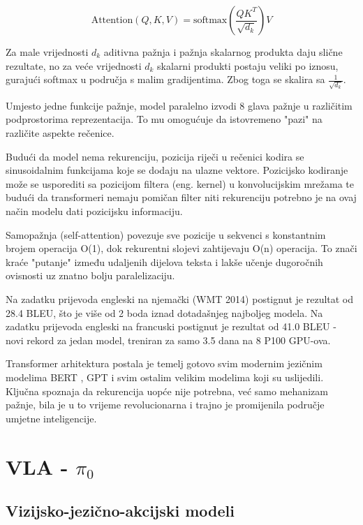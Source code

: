 \documentclass[times, utf8, diplomski]{fer}
\begin{document}
\begin{equation}
    \text{Attention}(Q, K, V) = \text{softmax}\left(\frac{QK^T}{\sqrt{d_k}}\right)V
\end{equation}

Za male vrijednosti $d_k$ aditivna pažnja \cite{bahdanau2014neural} i pažnja skalarnog produkta daju slične rezultate, no za veće vrijednosti $d_k$ skalarni produkti postaju veliki po iznosu, gurajući softmax u područja s malim gradijentima. Zbog toga se skalira sa $\frac{1}{\sqrt{d_k}}$.

Umjesto jedne funkcije pažnje, model paralelno izvodi 8 glava pažnje u različitim podprostorima reprezentacija. To mu omogućuje da istovremeno "pazi" na različite aspekte rečenice.

Budući da model nema rekurenciju, pozicija riječi u rečenici kodira se sinusoidalnim funkcijama koje se dodaju na ulazne vektore. Pozicijsko kodiranje može se usporediti sa pozicijom filtera (eng. kernel) u konvolucijskim mrežama te budući da transformeri nemaju pomičan filter niti rekurenciju potrebno je na ovaj način modelu dati pozicijsku informaciju.

Samopažnja (self-attention) povezuje sve pozicije u sekvenci s konstantnim brojem operacija O(1), dok rekurentni slojevi zahtijevaju O(n) operacija. To znači kraće "putanje" između udaljenih dijelova teksta i lakše učenje dugoročnih ovisnosti uz znatno bolju paralelizaciju.

Na zadatku prijevoda engleski na njemački (WMT 2014) postignut je rezultat od 28.4 BLEU, što je više od 2 boda iznad dotadašnjeg najboljeg modela. Na zadatku prijevoda engleski na francuski postignut je rezultat od 41.0 BLEU - novi rekord za jedan model, treniran za samo 3.5 dana na 8 P100 GPU-ova.

Transformer arhitektura postala je temelj gotovo svim modernim jezičnim modelima BERT \cite{devlin2019bert}, GPT \cite{radford2018gpt} i svim ostalim velikim modelima koji su uslijedili. Ključna spoznaja da rekurencija uopće nije potrebna, već samo mehanizam pažnje, bila je u to vrijeme revolucionarna i trajno je promijenila područje umjetne inteligencije.

\section{VLA - $\pi_0$}

\subsection{Vizijsko-jezično-akcijski modeli}
 
\end{document}

